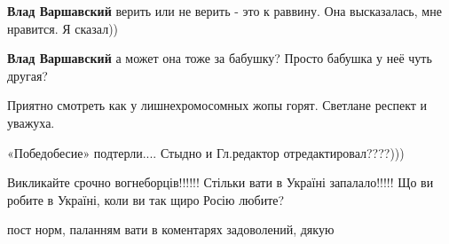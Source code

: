\begin{itemize}
\begin{itemize}
\textbf{Влад Варшавский} верить или не верить - это к раввину. Она высказалась, мне нравится. Я сказал))

 
\textbf{Влад Варшавский} а может она тоже за бабушку? Просто бабушка у неё чуть другая?
\end{itemize}

 
Приятно смотреть как у лишнехромосомных жопы горят. Светлане респект и уважуха.

 
«Победобесие» подтерли.... Стыдно и Гл.редактор отредактировал????)))

 
Викликайте срочно вогнеборців!!!!!! Стільки вати в Україні запалало!!!!! Що ви робите в Україні, коли ви так щиро Росію любите?

 
пост норм, паланням вати в коментарях задоволений, дякую

 

\end{itemize}
